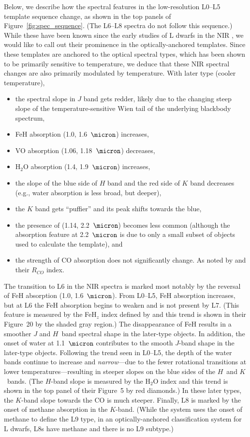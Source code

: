 \documentclass[12pt,preprint]{aastex}
\begin{document}
Below, we describe how the spectral features in the low-resolution L0--L5 template sequence change, as shown in the top panels of Figure~\ref{fig:spec_sequence}. (The L6--L8 spectra do not follow this sequence.)
While these have been known since the early studies of L dwarfs in the NIR \citep{Testi01,Geballe02}, we would like to call out their prominence in the optically-anchored templates.
Since these templates are anchored to the optical spectral types, which has been shown to be primarily sensitive to temperature, we deduce that these NIR spectral changes are also primarily modulated by temperature.
With later type (cooler temperature), 
\begin{itemize}
\item the spectral slope in $J$ band gets redder, likely due to the changing steep slope of the temperature-sensitive Wien tail of the underlying blackbody spectrum,
\item FeH absorption (1.0, 1.6~$\micron$) increases,
\item VO absorption (1.06, 1.18~$\micron$) decreases,
\item H$_2$O absorption (1.4, 1.9~$\micron$) increases,
\item the slope of the blue side of $H$ band and the red side of $K$ band decreases (e.g., water absorption is less broad, but deeper), 
\item the $K$ band gets ``puffier'' and its peak shifts towards the blue,
\item the presence of  (1.14, 2.2~$\micron$) becomes less common (although the absorption feature at 2.2~$\micron$ is due to only a small subset of objects used to calculate the template), and
\item the strength of CO absorption does not significantly change. As noted by \citet{Reid01_NIR} and their $R_{CO}$ index.
\end{itemize}

The transition to L6 in the NIR spectra is marked most notably by the reversal of FeH absorption (1.0, 1.6~$\micron$). From L0--L5, FeH absorption increases, but at L6 the FeH absorption begins to weaken and is not present by L7. (This feature is measured by the FeH$_z$ index defined by \citet{Allers:2013hk} and this trend is shown in their Figure~20 by the shaded gray region.) The disappearance of FeH results in a smoother $J$ and $H$~band spectral shape in the later-type objects. In addition, the onset of water at 1.1~$\micron$ contributes to the smooth $J$-band shape in the later-type objects. Following the trend seen in L0--L5, the depth of the water bands continue to increase and \emph{narrow}---due to the fewer rotational transitions at lower temperatures---resulting in steeper slopes on the blue sides of the $H$~and $K$~bands. (The $H$-band slope is measured by the \citet{Allers07} H$_2$O index and this trend is shown in the top panel of their Figure~5 by red diamonds.) In these later types, the $K$-band slope towards the CO is much steeper. Finally, L8 is marked by the onset of methane absorption in the $K$-band. (While the \citet{Geballe02} system uses the onset of methane to define the L9 type, in an optically-anchored classification system for L dwarfs, L8s have methane and there is no L9 subtype.) 
\end{document}
